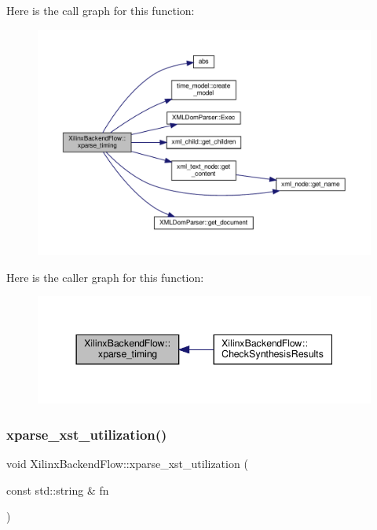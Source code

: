 Here is the call graph for this function\+:
\nopagebreak
\begin{figure}[H]
\begin{center}
\leavevmode
\includegraphics[width=350pt]{d6/d94/classXilinxBackendFlow_ad6ce13107d22bc9adc43b9b5e1423e6d_cgraph}
\end{center}
\end{figure}
Here is the caller graph for this function\+:
\nopagebreak
\begin{figure}[H]
\begin{center}
\leavevmode
\includegraphics[width=344pt]{d6/d94/classXilinxBackendFlow_ad6ce13107d22bc9adc43b9b5e1423e6d_icgraph}
\end{center}
\end{figure}
\mbox{\label{classXilinxBackendFlow_a396e92b4d7e3867c814afa25787a7ed6}} 
\subsubsection{\texorpdfstring{xparse\+\_\+xst\+\_\+utilization()}{xparse\_xst\_utilization()}}
{\footnotesize\ttfamily void Xilinx\+Backend\+Flow\+::xparse\+\_\+xst\+\_\+utilization (\begin{DoxyParamCaption}\item[{const std\+::string \&}]{fn }\end{DoxyParamCaption})\hspace{0.3cm}{\ttfamily [protected]}}



